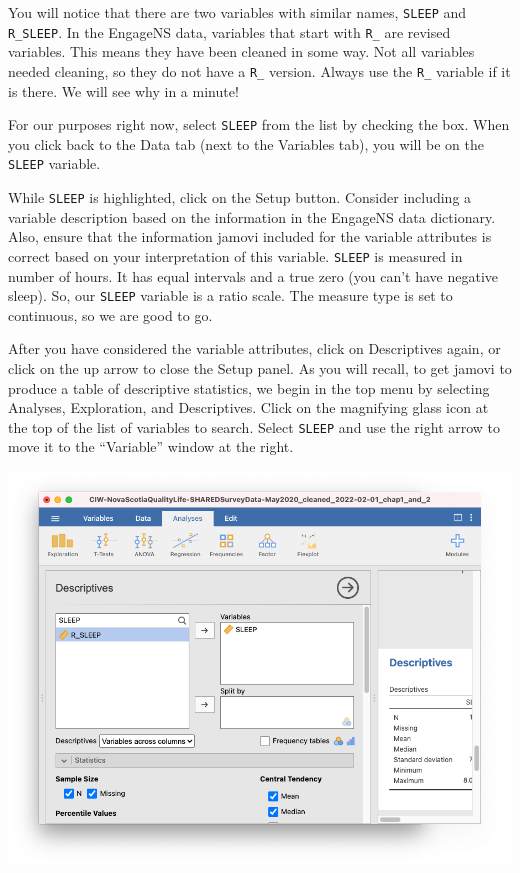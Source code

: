 \documentclass[
]{book}
\begin{document}
You will notice that there are two variables with similar names, \texttt{SLEEP} and \texttt{R\_SLEEP}. In the EngageNS data, variables that start with \texttt{R\_} are revised variables. This means they have been cleaned in some way. Not all variables needed cleaning, so they do not have a \texttt{R\_} version. Always use the \texttt{R\_} variable if it is there. We will see why in a minute!

For our purposes right now, select \texttt{SLEEP} from the list by checking the box. When you click back to the Data tab (next to the Variables tab), you will be on the \texttt{SLEEP} variable.

While \texttt{SLEEP} is highlighted, click on the {Setup} button. Consider including a variable description based on the information in the EngageNS data dictionary. Also, ensure that the information jamovi included for the variable attributes is correct based on your interpretation of this variable. \texttt{SLEEP} is measured in number of hours. It has equal intervals and a true zero (you can't have negative sleep). So, our \texttt{SLEEP} variable is a ratio scale. The measure type is set to continuous, so we are good to go.

After you have considered the variable attributes, click on {Descriptives} again, or click on the up arrow to close the Setup panel. As you will recall, to get jamovi to produce a table of descriptive statistics, we begin in the top menu by selecting {Analyses}, {Exploration}, and {Descriptives}. Click on the magnifying glass icon at the top of the list of variables to search. Select \texttt{SLEEP} and use the right arrow to move it to the ``Variable'' window at the right.

\includegraphics{img/movesleep.png}
\end{document}
